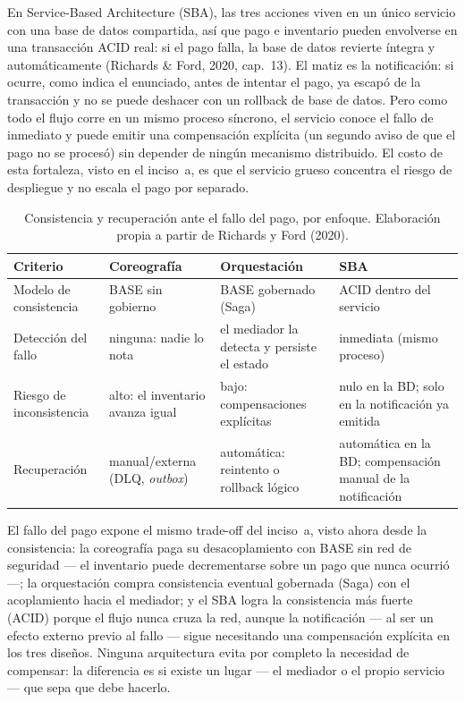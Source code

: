 En Service-Based Architecture (SBA), las tres acciones viven en un único servicio
con una base de datos compartida, así que pago e inventario pueden envolverse en
una transacción ACID real: si el pago falla, la base de datos revierte íntegra y
automáticamente (Richards \& Ford, 2020, cap.~13). El matiz es la notificación:
si ocurre, como indica el enunciado, antes de intentar el pago, ya escapó de la
transacción y no se puede deshacer con un rollback de base de datos. Pero como
todo el flujo corre en un mismo proceso síncrono, el servicio conoce el fallo de
inmediato y puede emitir una compensación explícita (un segundo aviso de que el
pago no se procesó) sin depender de ningún mecanismo distribuido. El costo de
esta fortaleza, visto en el inciso~a, es que el servicio grueso concentra el
riesgo de despliegue y no escala el pago por separado.

\begin{table}[H]
  \centering
  \caption{Consistencia y recuperación ante el fallo del pago, por enfoque.
    Elaboración propia a partir de Richards y Ford (2020).}
  \label{tab:p1b-comparacion}
  \small
  \renewcommand{\arraystretch}{1.35}
  \begin{tabularx}{\textwidth}{>{\raggedright\arraybackslash}p{3.1cm} >{\raggedright\arraybackslash}X >{\raggedright\arraybackslash}X >{\raggedright\arraybackslash}X}
    \toprule
    \textbf{Criterio} & \textbf{Coreografía} & \textbf{Orquestación} & \textbf{SBA} \\
    \midrule
    Modelo de consistencia &
      BASE sin gobierno &
      BASE gobernado (Saga) &
      ACID dentro del servicio \\
    Detección del fallo &
      ninguna: nadie lo nota &
      el mediador la detecta y persiste el estado &
      inmediata (mismo proceso) \\
    Riesgo de inconsistencia &
      alto: el inventario avanza igual &
      bajo: compensaciones explícitas &
      nulo en la BD; solo en la notificación ya emitida \\
    Recuperación &
      manual/externa (DLQ, \emph{outbox}) &
      automática: reintento o rollback lógico &
      automática en la BD; compensación manual de la notificación \\
    \bottomrule
  \end{tabularx}
\end{table}

El fallo del pago expone el mismo trade-off del inciso~a, visto ahora desde la
consistencia: la coreografía paga su desacoplamiento con BASE sin red de
seguridad --- el inventario puede decrementarse sobre un pago que nunca ocurrió
---; la orquestación compra consistencia eventual gobernada (Saga) con el
acoplamiento hacia el mediador; y el SBA logra la consistencia más fuerte (ACID)
porque el flujo nunca cruza la red, aunque la notificación --- al ser un efecto
externo previo al fallo --- sigue necesitando una compensación explícita en los
tres diseños. Ninguna arquitectura evita por completo la necesidad de compensar:
la diferencia es si existe un lugar --- el mediador o el propio servicio --- que
sepa que debe hacerlo.
